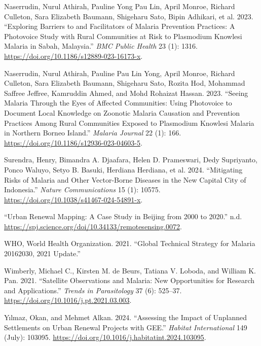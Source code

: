 \documentclass[
  letterpaper,
  DIV=11,
  numbers=noendperiod]{scrreprt}
\newlength{\cslhangindent}
\newlength{\cslentryspacingunit} %
\newenvironment{CSLReferences}[2] %
 {%
  \setlength{\parindent}{0pt}
  \ifodd #1
  \let\oldpar\par
  \def\par{\hangindent=\cslhangindent\oldpar}
  \fi
  \setlength{\parskip}{#2\cslentryspacingunit}
 }%
 {}
\begin{document}
\begin{CSLReferences}{1}{0}
\leavevmode{}%
Naserrudin, Nurul Athirah, Pauline Yong Pau Lin, April Monroe, Richard
Culleton, Sara Elizabeth Baumann, Shigeharu Sato, Bipin Adhikari, et al.
2023. {``Exploring Barriers to and Facilitators of Malaria Prevention
Practices: A Photovoice Study with Rural Communities at Risk to
Plasmodium Knowlesi Malaria in Sabah, Malaysia.''} \emph{BMC Public
Health} 23 (1): 1316. \url{https://doi.org/10.1186/s12889-023-16173-x}.

\leavevmode{}%
Naserrudin, Nurul Athirah, Pauline Pau Lin Yong, April Monroe, Richard
Culleton, Sara Elizabeth Baumann, Shigeharu Sato, Rozita Hod, Mohammad
Saffree Jeffree, Kamruddin Ahmed, and Mohd Rohaizat Hassan. 2023.
{``Seeing Malaria Through the Eyes of Affected Communities: Using
Photovoice to Document Local Knowledge on Zoonotic Malaria Causation and
Prevention Practices Among Rural Communities Exposed to Plasmodium
Knowlesi Malaria in Northern Borneo Island.''} \emph{Malaria Journal} 22
(1): 166. \url{https://doi.org/10.1186/s12936-023-04603-5}.

\leavevmode{}%
Surendra, Henry, Bimandra A. Djaafara, Helen D. Prameswari, Dedy
Supriyanto, Ponco Waluyo, Setyo B. Basuki, Herdiana Herdiana, et al.
2024. {``Mitigating Risks of Malaria and Other Vector-Borne Diseases in
the New Capital City of Indonesia.''} \emph{Nature Communications} 15
(1): 10575. \url{https://doi.org/10.1038/s41467-024-54891-x}.

\leavevmode{}%
{``Urban Renewal Mapping: A Case Study in Beijing from 2000 to 2020.''}
n.d. \url{https://spj.science.org/doi/10.34133/remotesensing.0072}.

\leavevmode{}%
WHO, World Health Organization. 2021. {``Global Technical Strategy for
Malaria 2016{\textendash}2030, 2021 Update.''}

\leavevmode{}%
Wimberly, Michael C., Kirsten M. de Beurs, Tatiana V. Loboda, and
William K. Pan. 2021. {``Satellite Observations and Malaria: New
Opportunities for Research and Applications.''} \emph{Trends in
Parasitology} 37 (6): 525--37.
\url{https://doi.org/10.1016/j.pt.2021.03.003}.

\leavevmode{}%
Yılmaz, Okan, and Mehmet Alkan. 2024. {``Assessing the Impact of
Unplanned Settlements on Urban Renewal Projects with GEE.''}
\emph{Habitat International} 149 (July): 103095.
\url{https://doi.org/10.1016/j.habitatint.2024.103095}.

\end{CSLReferences}
\end{document}
